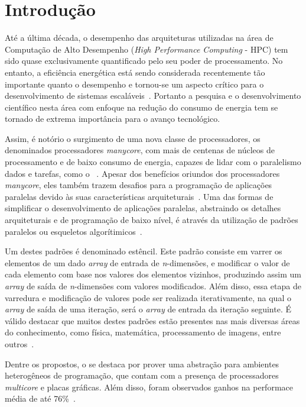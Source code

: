 \chapter[Introdução]{Introdução}

Até a última década, o desempenho das arquiteturas utilizadas na área de Computação de Alto Desempenho (\textit{High Performance Computing} - HPC) tem sido quase exclusivamente quantificado pelo seu poder de processamento. No entanto, a eficiência energética está sendo considerada recentemente tão importante quanto o desempenho e tornou-se um aspecto crítico para o desenvolvimento de sistemas escaláveis~\cite{francesquini:hal-01092325}. Portanto a pesquisa e o desenvolvimento científico nesta área com enfoque na redução do consumo de energia tem se tornado de extrema importância para o avanço tecnológico.

Assim, é notório o surgimento de uma nova classe de processadores, os denominados processadores \textit{manycore}, com mais de centenas de núcleos de processamento e de baixo consumo de energia, capazes de lidar com o paralelismo dados e tarefas, como o \mppa~\cite{castro2013}. 
Apesar dos benefícios oriundos dos processadores \textit{manycore}, eles também trazem desafios para a programação de aplicações paralelas devido às suas características arquiteturais~\cite{castro:hal-01273153}. Uma das formas de simplificar o desenvolvimento de aplicações paralelas, abstraindo os detalhes arquiteturais e de programação de baixo nível, é através da utilização de padrões paralelos ou esqueletos algorítimicos~\cite{COLE2004389}.

Um destes padrões é denominado estêncil. Este padrão consiste em varrer os elementos de um dado \textit{array} de entrada de \textit{n}-dimensões, e modificar o valor de cada elemento com base nos valores dos elementos vizinhos, produzindo assim um \textit{array} de saída de \textit{n}-dimensões com valores modificados. Além disso, essa etapa de varredura e modificação de valores pode ser realizada iterativamente, na qual o \textit{array} de saída de uma iteração, será o \textit{array} de entrada da iteração seguinte. É válido destacar que muitos destes padrões estão presentes nas mais diversas áreas do conhecimento, como física, matemática, processamento de imagens, entre outros~\cite{Holewinski:2012:HCG:2304576.2304619}.

Dentre os \fws propostos, o \pskel se destaca por prover uma abstração para ambientes heterogêneos de programação, que contam com a presença de processadores \textit{multicore} e placas gráficas. Além disso, foram observados ganhos na performace média de até 76\%~\cite{CPE:CPE3479}.

